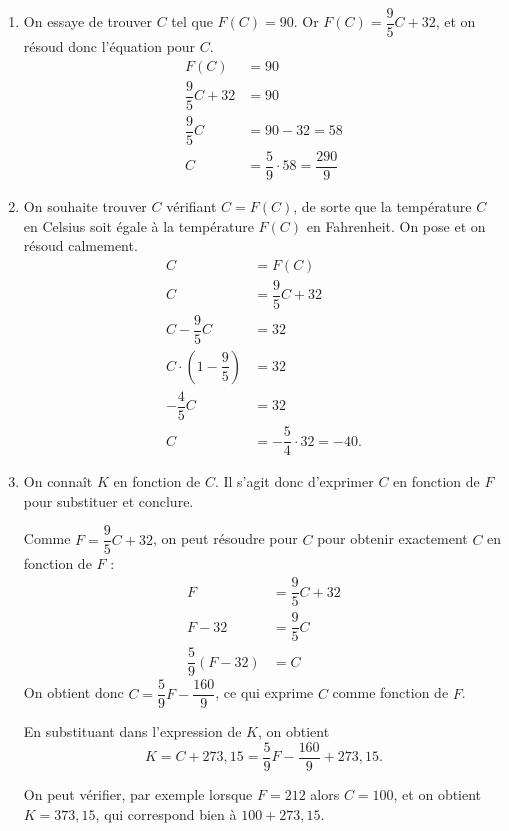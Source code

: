 {\begin{enumerate}
		On en déduit que $F(C) = \dfrac95 C + b$.
		Comme $A(-10;14)$ appartient à la courbe, on a forcément $F(-10) = 14$.
		On réécrit l'équation et on résoud pour $b$.
			\begin{align*}
				F(-10) &= 14 \\
				\dfrac95 \cdot (-10) + b &= 14 \\
				-18 + b &= 14 \\
				b& = 32
			\end{align*}
			
		Méthode alternative : il existe une unique droite passant par deux points distincts. 
		En montrant que $A$ et $B$ appartiennent à la courbe représentative de la fonction affine $g(x) = \dfrac95 x + 32$, on a alors forcément $F = g$.
		
		\item
			On essaye de trouver $C$ tel que $F(C) = 90$.
			Or $F(C) = \dfrac95 C + 32$, et on résoud donc l'équation pour $C$.
				\begin{align*}
					F(C) &= 90 \\
					\dfrac95 C + 32 &= 90 \\
					\dfrac95 C &= 90-32 = 58 \\
					C &= \dfrac59 \cdot 58 = \dfrac{290}{9}
				\end{align*}
		
		\item 
			On souhaite trouver $C$ vérifiant $C = F(C)$, de sorte que la température $C$ en Celsius soit égale à la température $F(C)$ en Fahrenheit.
			On pose et on résoud calmement.
				\begin{align*}
					C &= F(C) \\
					C &= \dfrac95 C + 32 \\
					C-\dfrac95 C &= 32 \\
					C\cdot\left(1-\dfrac95\right) &= 32 \\
					-\dfrac45 C &= 32 \\
					C &= - \dfrac54 \cdot 32 = -40.
				\end{align*}
		
		\item
			On connaît $K$ en fonction de $C$.
			Il s'agit donc d'exprimer $C$ en fonction de $F$ pour substituer et conclure.
			
			Comme $F = \dfrac95 C + 32$, on peut résoudre pour $C$ pour obtenir exactement $C$ en fonction de $F$ :
				\begin{align*}
					F &= \dfrac95 C + 32 \\
					F -32 &= \dfrac95 C \\
					\dfrac59 \left(F - 32\right) &= C
				\end{align*}
			On obtient donc $C= \dfrac59 F - \dfrac{160}9$, ce qui exprime $C$ comme fonction de $F$.
			
			En substituant dans l'expression de $K$, on obtient
				\[ K = C + 273,15 = \dfrac59 F - \dfrac{160}9 + 273,15. \]
			
			On peut vérifier, par exemple lorsque $F=212$ alors $C=100$, et on obtient $K = 373,15$, qui correspond bien à $100 + 273,15$.
	\end{enumerate}

}

